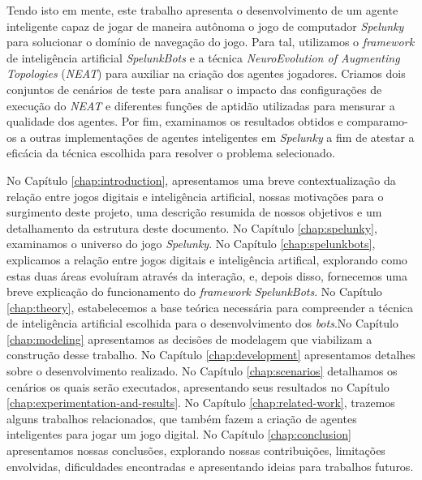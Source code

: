 Tendo isto em mente, este trabalho apresenta o desenvolvimento de um agente
inteligente capaz de jogar de maneira autônoma o jogo de computador
\textit{Spelunky} para solucionar o domínio de navegação do jogo. Para tal,
utilizamos o \textit{framework} de inteligência artificial \textit{SpelunkBots}
e a técnica \textit{NeuroEvolution of Augmenting Topologies} (\textit{NEAT})
para auxiliar na criação dos agentes jogadores. Criamos dois conjuntos de
cenários de teste para analisar o impacto das configurações de execução do
\textit{NEAT} e diferentes funções de aptidão utilizadas para mensurar a
qualidade dos agentes. Por fim, examinamos os resultados obtidos e comparamo-os
a outras implementações de agentes inteligentes em \textit{Spelunky} a fim de
atestar a eficácia da técnica escolhida para resolver o problema selecionado.

No Capítulo \ref{chap:introduction}, apresentamos uma breve contextualização da
relação entre jogos digitais e inteligência artificial, nossas motivações para o
surgimento deste projeto, uma descrição resumida de nossos objetivos e um
detalhamento da estrutura deste documento. No Capítulo \ref{chap:spelunky},
examinamos o universo do jogo \textit{Spelunky}. No Capítulo
\ref{chap:spelunkbots}, explicamos a relação entre jogos digitais e inteligência
artifical, explorando como estas duas áreas evoluíram através da interação, e,
depois disso, fornecemos uma breve explicação do funcionamento do
\textit{framework} \textit{SpelunkBots}. No Capítulo \ref{chap:theory},
estabelecemos a base teórica necessária para compreender a técnica de
inteligência artificial escolhida para o desenvolvimento dos \textit{bots}.No
Capítulo \ref{chap:modeling} apresentamos as decisões de modelagem que
viabilizam a construção desse trabalho. No Capítulo \ref{chap:development}
apresentamos detalhes sobre o desenvolvimento realizado.  No Capítulo
\ref{chap:scenarios} detalhamos os cenários os quais serão executados,
apresentando seus resultados no Capítulo \ref{chap:experimentation-and-results}.
No Capítulo \ref{chap:related-work}, trazemos alguns trabalhos relacionados, que
também fazem a criação de agentes inteligentes para jogar um jogo digital. No
Capítulo \ref{chap:conclusion} apresentamos nossas conclusões, explorando nossas
contribuições, limitações envolvidas, dificuldades encontradas e apresentando
ideias para trabalhos futuros.
